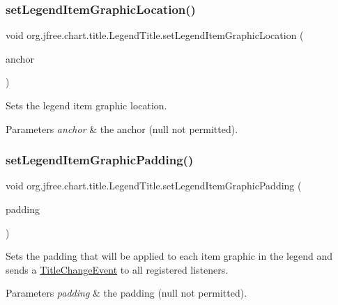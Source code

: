 \subsubsection{\texorpdfstring{set\+Legend\+Item\+Graphic\+Location()}{setLegendItemGraphicLocation()}}
{\footnotesize\ttfamily void org.\+jfree.\+chart.\+title.\+Legend\+Title.\+set\+Legend\+Item\+Graphic\+Location (\begin{DoxyParamCaption}\item[{Rectangle\+Anchor}]{anchor }\end{DoxyParamCaption})}

Sets the legend item graphic location.


\begin{DoxyParams}{Parameters}
{\em anchor} & the anchor ({\ttfamily null} not permitted). \\
\hline
\end{DoxyParams}
\mbox{\label{classorg_1_1jfree_1_1chart_1_1title_1_1_legend_title_a00c3d29c97cdc18a4b161035ef14750e}} 
\subsubsection{\texorpdfstring{set\+Legend\+Item\+Graphic\+Padding()}{setLegendItemGraphicPadding()}}
{\footnotesize\ttfamily void org.\+jfree.\+chart.\+title.\+Legend\+Title.\+set\+Legend\+Item\+Graphic\+Padding (\begin{DoxyParamCaption}\item[{Rectangle\+Insets}]{padding }\end{DoxyParamCaption})}

Sets the padding that will be applied to each item graphic in the legend and sends a \mbox{\hyperlink{}{Title\+Change\+Event}} to all registered listeners.


\begin{DoxyParams}{Parameters}
{\em padding} & the padding ({\ttfamily null} not permitted). \\
\hline
\end{DoxyParams}
\mbox{\label{classorg_1_1jfree_1_1chart_1_1title_1_1_legend_title_a04219301646c45796f645882a3bd187f}} 

